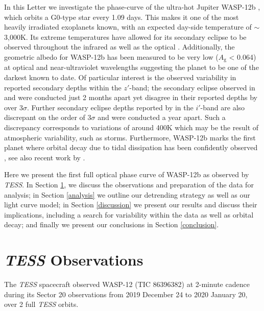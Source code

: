 \documentclass[fleqn,usenatbib]{mnras}
\begin{document}
In this Letter we investigate the phase-curve of the ultra-hot Jupiter WASP-12b \citep{wasp12b}, which orbits a G0-type star every 1.09 days. This makes it one of the most heavily irradiated exoplanets known, with an expected day-side temperature of $\sim$3,000K. Its extreme temperatures have allowed for its secondary eclipse to be observed throughout the infrared \citep{croll, campo, zhao, crossfield, cowan, stevenson, bell2} as well as the optical \citep{lopes, foehring, hooton, vonessen}. Additionally, the geometric albedo for WASP-12b has been measured to be very low ($A_{\mathrm{g}}$ < 0.064) at optical and near-ultraviolet wavelengths \citep{bell} suggesting the planet to be one of the darkest known to date. Of particular interest is the observed variability in reported secondary depths within the $z'$-band; the secondary eclipse observed in \citet{lopes} and \citet{foehring} were conducted just 2 months apart yet disagree in their reported depths by over 3$\sigma$. Further secondary eclipse depths reported by \citet{hooton} in the $i'$-band are also discrepant on the order of 3$\sigma$ and were conducted a year apart. Such a discrepancy corresponds to variations of around 400K which may be the result of atmospheric variability, such as storms. Furthermore, WASP-12b marks the first planet where orbital decay due to tidal dissipation has been confidently observed \citep{orbitdecay}, see also recent work by \cite{turner2020}.

Here we present the first full optical phase curve of WASP-12b as observed by \textit{TESS}. In Section \ref{observations}, we discuss the observations and preparation of the data for analysis; in Section \ref{analysis} we outline our detrending strategy as well as our light curve model; in Section \ref{discussion} we present our results and discuss their implications, including a search for variability within the data as well as orbital decay; and finally we present our conclusions in Section \ref{conclusion}.

\section{\textit{TESS} Observations}\label{observations}
The \textit{TESS} spacecraft observed WASP-12 (TIC 86396382) at 2-minute cadence during its Sector 20 observations from 2019 December 24 to 2020 January 20, over 2 full \textit{TESS} orbits.
\end{document}
